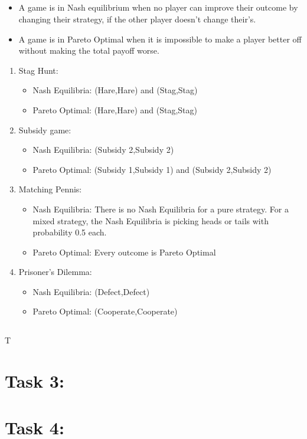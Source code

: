 \documentclass[12pt,letterpaper, onecolumn]{exam}
\begin{document}
\subsection{}
\begin{itemize}
    \item A game is in Nash equilibrium when no player can improve their outcome by changing their strategy, if the other player doesn't change their's.
    \item A game is in Pareto Optimal when it is impossible to make a player better off without making the total payoff worse.
\end{itemize}
\begin{enumerate}[(\alph*)]
    \item Stag Hunt:
    \begin{itemize}
        \item Nash Equilibria: (Hare,Hare) and (Stag,Stag)
        \item Pareto Optimal: (Hare,Hare) and (Stag,Stag)
    \end{itemize}
    \item Subsidy game:
    \begin{itemize}
        \item Nash Equilibria: (Subsidy 2,Subsidy 2)
        \item Pareto Optimal: (Subsidy 1,Subsidy 1) and (Subsidy 2,Subsidy 2)
    \end{itemize}
    \item Matching Pennis:
    \begin{itemize}
        \item Nash Equilibria: There is no Nash Equilibria for a pure strategy. For a mixed strategy, the Nash Equilibria is picking heads or tails with probability 0.5 each.
        \item Pareto Optimal: Every outcome is Pareto Optimal
    \end{itemize}
    \item Prisoner's Dilemma:
    \begin{itemize}
        \item Nash Equilibria: (Defect,Defect)
        \item Pareto Optimal: (Cooperate,Cooperate)
    \end{itemize}
\end{enumerate}

\subsection{}

T

\subsection{}

\section{\textbf{Task 3:}}

\section{\textbf{Task 4:}}
\end{document}
